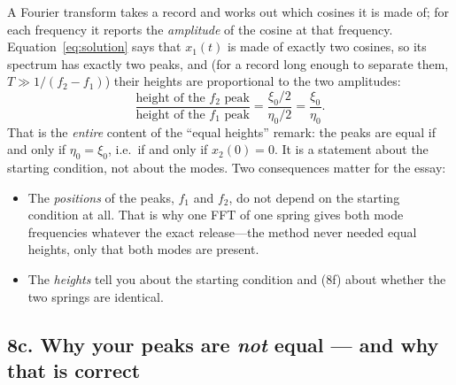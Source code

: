 \documentclass[11pt,a4paper]{article}
\begin{document}
A Fourier transform takes a record and works out which cosines it is made of; for each frequency it reports the \emph{amplitude} of the cosine at that frequency. Equation~\eqref{eq:solution} says that $x_1(t)$ is made of exactly two cosines, so its spectrum has exactly two peaks, and (for a record long enough to separate them, $T\gg1/(f_2-f_1)$) their heights are proportional to the two amplitudes:
\begin{equation}
\frac{\text{height of the $f_2$ peak}}{\text{height of the $f_1$ peak}}=\frac{\xi_0/2}{\eta_0/2}=\frac{\xi_0}{\eta_0}.
\label{eq:ratio}
\end{equation}
That is the \emph{entire} content of the ``equal heights'' remark: the peaks are equal if and only if $\eta_0=\xi_0$, i.e.\ if and only if $x_2(0)=0$. It is a statement about the starting condition, not about the modes. Two consequences matter for the essay:
\begin{itemize}[nosep]
\item The \emph{positions} of the peaks, $f_1$ and $f_2$, do not depend on the starting condition at all. That is why one FFT of one spring gives both mode frequencies whatever the exact release---the method never needed equal heights, only that both modes are present.
\item The \emph{heights} tell you about the starting condition and (8f) about whether the two springs are identical.
\end{itemize}

\subsection*{8c. Why your peaks are \emph{not} equal --- and why that is correct}
\end{document}
